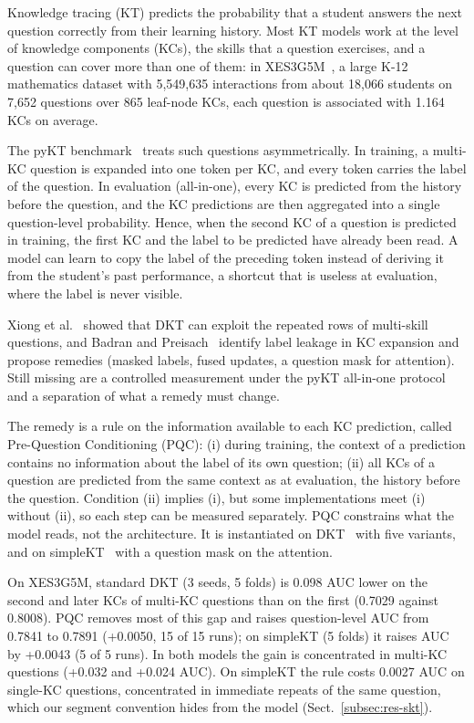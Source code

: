 Knowledge tracing (KT) predicts the probability that a student answers the next question correctly from their learning history. Most KT models work at the level of knowledge components (KCs), the skills that a question exercises, and a question can cover more than one of them: in XES3G5M~\cite{liu2023xes3g5m}, a large K-12 mathematics dataset with 5,549,635 interactions from about 18,066 students on 7,652 questions over 865 leaf-node KCs, each question is associated with 1.164 KCs on average.

The pyKT benchmark~\cite{liu2022pykt} treats such questions asymmetrically. 
In training, a multi-KC question is expanded into one token per KC, and every token carries the label of the question. 
In evaluation (all-in-one), every KC is predicted from the history before the question, and the KC predictions are then aggregated into a single question-level probability. 
Hence, when the second KC of a question is predicted in training, the first KC and the label to be predicted have already been read. 
A model can learn to copy the label of the preceding token instead of deriving it from the student's past performance, a shortcut that is useless at evaluation, where the label is never visible. 

Xiong et al.~\cite{xiong2016going} showed that DKT can exploit the repeated rows of multi-skill questions, and Badran and Preisach~\cite{DBLP:conf/csedu/BadranP25a,badran2026enhancing} identify label leakage in KC expansion and propose remedies (masked labels, fused updates, a question mask for attention). Still missing are a controlled measurement under the pyKT all-in-one protocol and a separation of what a remedy must change.

The remedy is a rule on the information available to each KC prediction, called Pre-Question Conditioning (PQC): (i) during training, the context of a prediction contains no information about the label of its own question; (ii) all KCs of a question are predicted from the same context as at evaluation, the history before the question. Condition (ii) implies (i), but some implementations meet (i) without (ii), so each step can be measured separately. PQC constrains what the model reads, not the architecture.
It is instantiated on DKT~\cite{piech2015deep} with five variants, and on simpleKT~\cite{DBLP:conf/iclr/0001L0H023} with a question mask on the attention.

On XES3G5M, standard DKT (3 seeds, 5 folds) is 0.098 AUC lower on the second and later KCs of multi-KC questions than on the first (0.7029 against 0.8008). PQC removes most of this gap and raises question-level AUC from 0.7841 to 0.7891 (+0.0050, 15 of 15 runs); on simpleKT (5 folds) it raises AUC by +0.0043 (5 of 5 runs). In both models the gain is concentrated in multi-KC questions (+0.032 and +0.024 AUC). On simpleKT the rule costs 0.0027 AUC on single-KC questions, concentrated in immediate repeats of the same question, which our segment convention hides from the model (Sect.~\ref{subsec:res-skt}).

